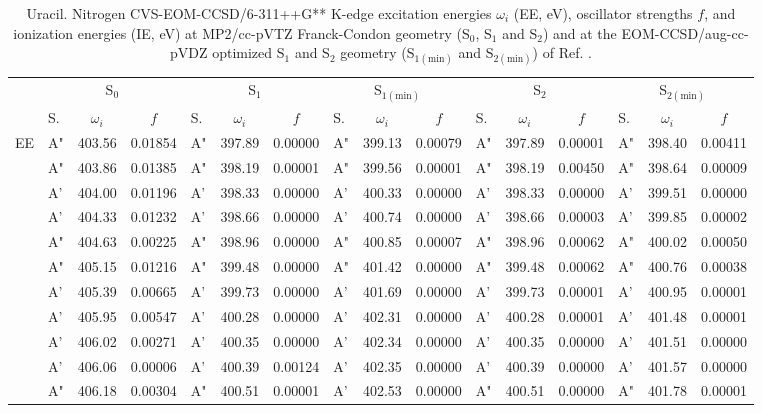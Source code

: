 \documentclass[journal=jctcce,manuscript=article]{achemso}
\begin{document}
\begin{table}
\caption{Uracil.  Nitrogen CVS-EOM-CCSD/6-311++G** K-edge excitation energies $\omega_i$ (EE, eV), oscillator strengths $f$, and ionization energies (IE, eV) at MP2/cc-pVTZ Franck-Condon geometry (S$_0$, S$_1$ and S$_2$) and at the EOM-CCSD/aug-cc-pVDZ optimized S$_1$ and S$_2$ geometry (S$_{1(\text{min})}$ and S$_{2(\text{min})}$) of Ref. .
\label{Tab:Uracil:CCSD:Nitrogen}}
\scriptsize
\begin{tabular}{l|lcc|lcc|lcc|lcc|lcc}
\cline{2-16}
& \multicolumn{3}{c|}{S$_0$}
& \multicolumn{3}{c|}{S$_1$}  
& \multicolumn{3}{c|}{S$_{1(\text{min})}$}
& \multicolumn{3}{c|}{S$_2$}
& \multicolumn{3}{c}{S$_{2(\text{min})}$}
\\
\cline{2-16}
& S. & $\omega_i$ & $f$ 
& S. & $\omega_i$ & $f$ 
& S. & $\omega_i$ & $f$ 
& S. & $\omega_i$ & $f$ 
& S. & $\omega_i$ & $f$\\
\hline
  EE 
& A" & 403.56 & 0.01854 & A" & 397.89 & 0.00000 & A" & 399.13 & 0.00079 & A" & 397.89 & 0.00001 & A" & 398.40 & 0.00411 \\
& A" & 403.86 & 0.01385 & A" & 398.19 & 0.00001 & A" & 399.56 & 0.00001 & A" & 398.19 & 0.00450 & A" & 398.64 & 0.00009 \\
& A' & 404.00 & 0.01196 & A' & 398.33 & 0.00000 & A' & 400.33 & 0.00000 & A' & 398.33 & 0.00000 & A' & 399.51 & 0.00000 \\
& A' & 404.33 & 0.01232 & A' & 398.66 & 0.00000 & A' & 400.74 & 0.00000 & A' & 398.66 & 0.00003 & A' & 399.85 & 0.00002 \\
& A" & 404.63 & 0.00225 & A" & 398.96 & 0.00000 & A" & 400.85 & 0.00007 & A" & 398.96 & 0.00062 & A" & 400.02 & 0.00050 \\
& A" & 405.15 & 0.01216 & A" & 399.48 & 0.00000 & A" & 401.42 & 0.00000 & A" & 399.48 & 0.00062 & A" & 400.76 & 0.00038 \\
& A' & 405.39 & 0.00665 & A' & 399.73 & 0.00000 & A' & 401.69 & 0.00000 & A' & 399.73 & 0.00001 & A' & 400.95 & 0.00001 \\
& A' & 405.95 & 0.00547 & A' & 400.28 & 0.00000 & A' & 402.31 & 0.00000 & A' & 400.28 & 0.00001 & A' & 401.48 & 0.00001 \\
& A' & 406.02 & 0.00271 & A' & 400.35 & 0.00000 & A' & 402.34 & 0.00000 & A' & 400.35 & 0.00000 & A' & 401.51 & 0.00000 \\
& A' & 406.06 & 0.00006 & A' & 400.39 & 0.00124 & A' & 402.35 & 0.00000 & A' & 400.39 & 0.00000 & A' & 401.57 & 0.00000 \\
& A" & 406.18 & 0.00304 & A" & 400.51 & 0.00001 & A' & 402.53 & 0.00000 & A" & 400.51 & 0.00000 & A" & 401.78 & 0.00001 \\

\end{tabular}
\end{table}
\end{document}
